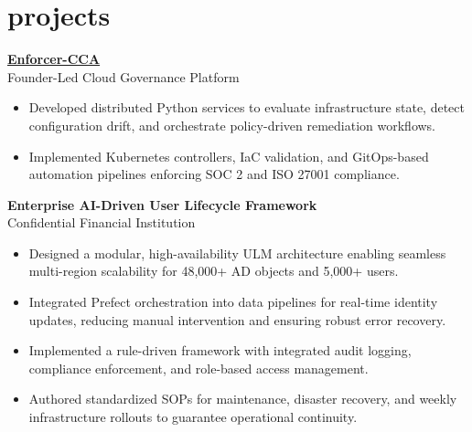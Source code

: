 \section{projects}\label{sec:projects}%
\begin{center}
    \begin{raggedright}
        \textbf{\href{https://www.enforcer-cca.com/}{Enforcer-CCA}} \\
        Founder-Led Cloud Governance Platform
        \vspace{-8pt}
        \begin{itemize}
            \itemsep-3pt
            \item Developed distributed Python services to evaluate infrastructure state, detect configuration drift, and orchestrate policy-driven remediation workflows.
            \item Implemented Kubernetes controllers, IaC validation, and GitOps-based automation pipelines enforcing SOC 2 and ISO 27001 compliance.
        \end{itemize}
        \vspace{-8pt}
    \end{raggedright}

    \begin{raggedright}
        \textbf{Enterprise AI-Driven User Lifecycle Framework} \\
        Confidential Financial Institution    
        \vspace{-8pt}
        \begin{itemize}
            \itemsep-3pt            
            \item Designed a modular, high-availability ULM architecture enabling seamless multi-region scalability for 48,000+ AD objects and 5,000+ users.
            \item Integrated Prefect orchestration into data pipelines for real-time identity updates, reducing manual intervention and ensuring robust error recovery.
            \item Implemented a rule-driven framework with integrated audit logging, compliance enforcement, and role-based access management.
            \item Authored standardized SOPs for maintenance, disaster recovery, and weekly infrastructure rollouts to guarantee operational continuity.
        \end{itemize}
        \vspace{-8pt}
    \end{raggedright}
\vspace{-12pt}
\end{center}